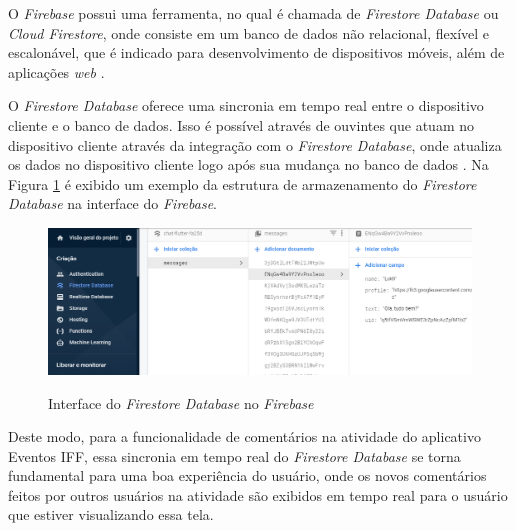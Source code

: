 O \textit{Firebase} possui uma ferramenta, no qual é chamada de \textit{Firestore Database} ou \textit{Cloud Firestore}, onde consiste em um banco de dados não relacional, flexível e escalonável, que é indicado para desenvolvimento de dispositivos móveis, além de aplicações \textit{web} \cite{google_firebase}.

O \textit{Firestore Database} oferece uma sincronia em tempo real entre o dispositivo cliente e o banco de dados. Isso é possível através de ouvintes que atuam no dispositivo cliente através da integração com o \textit{Firestore Database}, onde atualiza os dados no dispositivo cliente logo após sua mudança no banco de dados \cite{google_firebase}. Na Figura \ref{fig:firebase} é exibido um exemplo da estrutura de armazenamento do \textit{Firestore Database} na interface do \textit{Firebase}.

\begin{figure}[H]
    \centering
    \caption{Interface do \textit{Firestore Database} no \textit{Firebase}}
    \includegraphics[scale=0.5]{figuras/firebase.PNG}
    \label{fig:firebase}
\end{figure}

Deste modo, para a funcionalidade de comentários na atividade do aplicativo Eventos IFF, essa sincronia em tempo real do \textit{Firestore Database} se torna fundamental para uma boa experiência do usuário, onde os novos comentários feitos por outros usuários na atividade são exibidos em tempo real para o usuário que estiver visualizando essa tela.